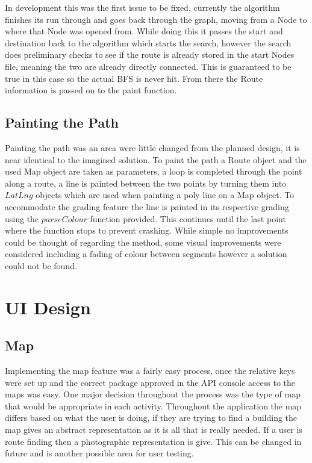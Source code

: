 In development this was the first issue to be fixed, currently the algorithm finishes its run through and goes back through the graph, moving from a Node to where that Node was opened from. While doing this it passes the start and destination back to the algorithm which starts the search, however the search does preliminary checks to see if the route is already stored in the start Nodes file, meaning the two are already directly connected. This is guaranteed to be true in this case so the actual BFS is never hit. From there the Route information is passed on to the paint function. 

\subsection{Painting the Path}
Painting the path was an area were little changed from the planned design, it is near identical to the imagined solution. To paint the path a Route object and the used Map object are taken as parameters, a loop is completed through the point along a route, a line is painted between the two points by turning them into $LatLng$ objects which are used when painting a poly line on a Map object. To accommodate the grading feature the line is painted in its respective grading using the $parseColour$ function provided. This continues until the last point where the function stops to prevent crashing. While simple no improvements could be thought of regarding the method, some visual improvements were considered including a fading of colour between segments however a solution could not be found. 

\section{UI Design}

\subsection{Map}

Implementing the map feature was a fairly easy process, once the relative keys were set up and the correct package approved in the API console access to the maps was easy. One major decision throughout the process was the type of map that would be appropriate in each activity. Throughout the application the map differs based on what the user is doing, if they are trying to find a building the map gives an abstract representation as it is all that is really needed. If a user is route finding then a photographic representation is give. This can be changed in future and is another possible area for user testing. 

